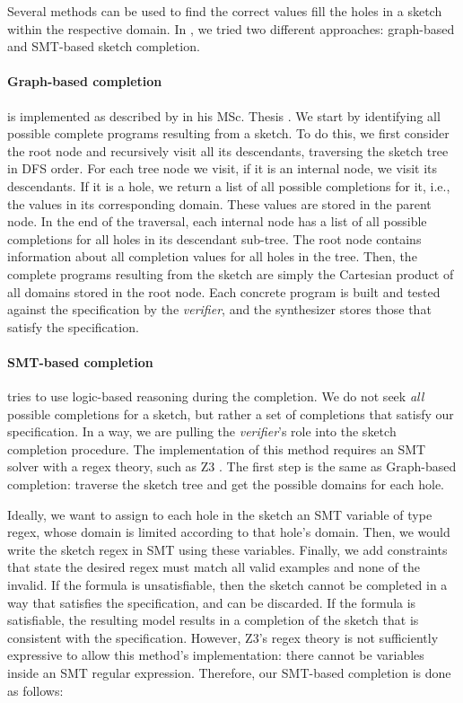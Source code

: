 Several methods can be used to find the correct values fill the holes in a sketch within the respective domain. In \Forest{}, we tried two different approaches: graph-based and \ac{SMT}-based sketch completion.

\paragraph{Graph-based completion} is implemented as described by \citeauthor{DanielThesis} in his MSc. Thesis \cite{DanielThesis}. We start by identifying all possible complete programs resulting from a sketch. To do this, we first consider the root node and recursively visit all its descendants, traversing the sketch tree in \ac{DFS} order. For each tree node we visit, if it is an internal node, we visit its descendants. If it is a hole, we return a list of all possible completions for it, i.e., the values in its corresponding domain. These values are stored in the parent node. In the end of the traversal, each internal node has a list of all possible completions for all holes in its descendant sub-tree. The root node contains information about all completion values for all holes in the tree. Then, the complete programs resulting from the sketch are simply the Cartesian product of all domains stored in the root node. Each concrete program is built and tested against the specification by the \textit{verifier}, and the synthesizer stores those that satisfy the specification.

\paragraph{SMT-based completion} tries to use logic-based reasoning during the completion.
We do not seek \textit{all} possible completions for a sketch, but rather a set of completions that satisfy our specification.
In a way, we are pulling the \textit{verifier}'s role into the sketch completion procedure.
The implementation of this method requires an \ac{SMT} solver with a regex theory, such as Z3 \cite{z3,z3str317}.
The first step is the same as Graph-based completion: traverse the sketch tree and get the possible domains for each hole.

Ideally, we want to assign to each hole in the sketch an SMT variable of type regex, whose domain is limited according to that hole's domain. Then, we would write the sketch regex in SMT using these variables. Finally, we add constraints that state the desired regex must match all valid examples and none of the invalid. If the formula is unsatisfiable, then the sketch cannot be completed in a way that satisfies the specification, and can be discarded. If the formula is satisfiable, the resulting model results in a completion of the sketch that is consistent with the specification.
However, Z3's regex theory is not sufficiently expressive to allow this method's implementation: there cannot be variables inside an SMT regular expression. Therefore, our SMT-based completion is done as follows:

